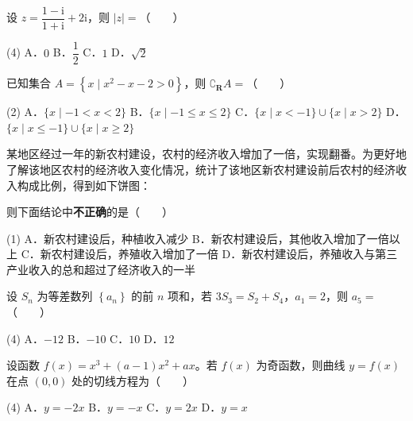 \begin{question}
设 $z=\dfrac{1-\mathrm i}{1+\mathrm i}+2\mathrm i$，则 $|z|=$\mbox{（　　）}

\begin{gkopts}(4)
\task A．$0$
\task B．$\dfrac12$
\task C．$1$
\task D．$\sqrt2$
\end{gkopts}

\end{question}
\begin{question}
已知集合 $A=\left\{x\mid x^{2}-x-2>0\right\}$，则 $\complement_{\mathbf R}A=$\mbox{（　　）}

\begin{gkopts}(2)
\task A．$\{x\mid-1<x<2\}$
\task B．$\{x\mid-1\le x\le2\}$
\task C．$\{x\mid x<-1\}\cup\{x\mid x>2\}$
\task D．$\{x\mid x\le-1\}\cup\{x\mid x\ge2\}$
\end{gkopts}

\Needspace{0.4\textheight}

\Needspace{0.4\textheight}
\end{question}
\begin{question}
某地区经过一年的新农村建设，农村的经济收入增加了一倍，实现翻番。为更好地了解该地区农村的经济收入变化情况，统计了该地区新农村建设前后农村的经济收入构成比例，得到如下饼图：
\nopagebreak[4]
\begin{center}\end{center}
\nopagebreak[4]
则下面结论中\textbf{不正确}的是\mbox{（　　）}

\begin{gkopts}(1)
\task A．新农村建设后，种植收入减少
\task B．新农村建设后，其他收入增加了一倍以上
\task C．新农村建设后，养殖收入增加了一倍
\task D．新农村建设后，养殖收入与第三产业收入的总和超过了经济收入的一半
\end{gkopts}

\end{question}
\begin{question}
设 $S_n$ 为等差数列 $\left\{a_n\right\}$ 的前 $n$ 项和，若 $3S_3=S_2+S_4$，$a_1=2$，则 $a_5=$\mbox{（　　）}

\begin{gkopts}(4)
\task A．$-12$
\task B．$-10$
\task C．$10$
\task D．$12$
\end{gkopts}

\end{question}
\begin{question}
设函数 $f(x)=x^{3}+(a-1)x^{2}+ax$。若 $f(x)$ 为奇函数，则曲线 $y=f(x)$ 在点 $(0,0)$ 处的切线方程为\mbox{（　　）}

\begin{gkopts}(4)
\task A．$y=-2x$
\task B．$y=-x$
\task C．$y=2x$
\task D．$y=x$
\end{gkopts}

\end{question}

